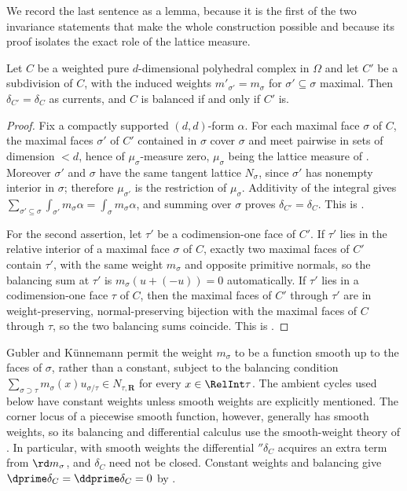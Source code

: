 We record the last sentence as a lemma, because it is the first of the two
invariance statements that make the whole construction possible and because
its proof isolates the exact role of the lattice measure.

\begin{lemma}
\label{lem:ch18-subdivision-invariance}
Let $C$ be a weighted pure $d$-dimensional polyhedral complex in $\Omega$
and let $C'$ be a subdivision of $C$, with the induced weights
$m'_{\sigma'}=m_\sigma$ for $\sigma'\subseteq\sigma$ maximal.  Then
$\delta_{C'}=\delta_C$ as currents, and $C$ is balanced if and only if $C'$
is.
\end{lemma}

\begin{proof}
Fix a compactly supported $(d,d)$-form $\alpha$.  For each maximal face
$\sigma$ of $C$, the maximal faces $\sigma'$ of $C'$ contained in $\sigma$
cover $\sigma$ and meet pairwise in sets of dimension $<d$, hence of
$\mu_\sigma$-measure zero, $\mu_\sigma$ being the lattice measure of
.  Moreover $\sigma'$ and $\sigma$ have the
same tangent lattice $N_\sigma$, since $\sigma'$ has nonempty interior in
$\sigma$; therefore $\mu_{\sigma'}$ is the restriction of $\mu_\sigma$.
Additivity of the integral gives
$\sum_{\sigma'\subseteq\sigma}\int_{\sigma'}m_\sigma\alpha
=\int_\sigma m_\sigma\alpha$, and summing over $\sigma$ proves
$\delta_{C'}=\delta_C$.  This is
.

For the second assertion, let $\tau'$ be a codimension-one face of $C'$.  If
$\tau'$ lies in the relative interior of a maximal face $\sigma$ of $C$,
exactly two maximal faces of $C'$ contain $\tau'$, with the same weight
$m_\sigma$ and opposite primitive normals, so the balancing sum at $\tau'$
is $m_\sigma(u+(-u))=0$ automatically.  If $\tau'$ lies in a codimension-one
face $\tau$ of $C$, then the maximal faces of $C'$ through $\tau'$ are in
weight-preserving, normal-preserving bijection with the maximal faces of $C$
through $\tau$, so the two balancing sums coincide.  This is
.
\end{proof}

\begin{remark}
\label{rem:ch18-two-weights}
Gubler and K\"unnemann permit the weight $m_\sigma$ to be a function smooth
up to the faces of $\sigma$, rather than a constant, subject to the balancing
condition
$\sum_{\sigma\supset\tau}m_\sigma(x)u_{\sigma/\tau}\in N_{\tau,\mathbf R}$ for every
$x\in\RelInt\tau$.  The ambient cycles used below have constant weights
unless smooth weights are explicitly mentioned.  The corner locus of a
piecewise smooth function, however, generally has smooth weights, so its
balancing and differential calculus use the smooth-weight theory of
\cite[\S\S1--3]{GK17}.  In particular, with smooth weights the differential
$\dprime\delta_C$ acquires an extra term from $\rd m_\sigma$, and
$\delta_C$ need not be closed.  Constant weights and balancing give
$\dprime\delta_C=\ddprime\delta_C=0$ by .
\end{remark}

